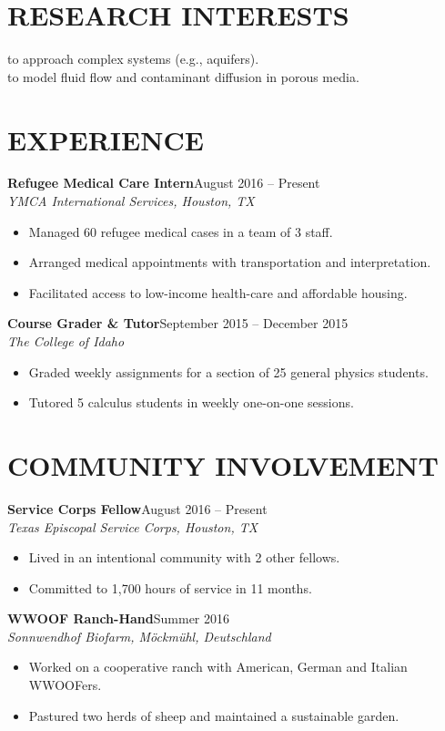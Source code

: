 \documentclass[margin]{res}
\newcommand\job[3]{\textbf{#1}\hfill {#2}\\ \emph{#3} }
\newenvironment{details}{\begin{itemize}[itemsep=0.6pt,topsep=2.2pt] }{\end{itemize} }
\begin{document}
\begin{resume}
\section{RESEARCH INTERESTS}

 to approach complex systems (e.g., aquifers).\\
 to model fluid flow and contaminant diffusion in porous media.

\section{EXPERIENCE}
\job{Refugee Medical Care Intern}{August 2016 -- Present}{YMCA International Services, Houston, TX}
    \begin{details}
        \item Managed 60 refugee medical cases in a team of 3 staff.
        \item Arranged medical appointments with transportation and interpretation.
        \item Facilitated access to low-income health-care and affordable housing.
    \end{details}
     
\job{Course Grader \& Tutor}{September 2015 -- December 2015}{The College of Idaho}
    \begin{details}
        \item Graded weekly assignments for a section of 25 general physics students.
        \item Tutored 5 calculus students in weekly one-on-one sessions.
    \end{details} 
   
\section{COMMUNITY INVOLVEMENT}
\job{Service Corps Fellow}{August 2016 -- Present}{Texas Episcopal Service Corps, Houston, TX}
    \begin{details}
        \item Lived in an intentional community with 2 other fellows.
        \item Committed to 1,700 hours of service in 11 months.
    \end{details}
            
\job{WWOOF Ranch-Hand}{Summer 2016}{Sonnwendhof Biofarm, M\"{o}ckm\"{u}hl, Deutschland}
        \begin{details}
            \item Worked on a cooperative ranch with American, German and Italian WWOOFers.
            \item Pastured two herds of sheep and maintained a sustainable garden.
        \end{details}
            

\end{resume}
\end{document}
